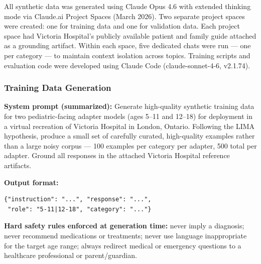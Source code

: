 \documentclass[journal]{IEEEtai}
\begin{document}
All synthetic data was generated using Claude Opus 4.6 with extended thinking mode via Claude.ai Project Spaces (March 2026). Two separate project spaces were created: one for training data and one for validation data. Each project space had Victoria Hospital's publicly available patient and family guide attached as a grounding artifact. Within each space, five dedicated chats were run --- one per category --- to maintain context isolation across topics. Training scripts and evaluation code were developed using Claude Code (claude-sonnet-4-6, v2.1.74).

\subsubsection*{Training Data Generation}

\noindent\textbf{System prompt (summarized):} Generate high-quality synthetic training data for two pediatric-facing adapter models (ages 5--11 and 12--18) for deployment in a virtual recreation of Victoria Hospital in London, Ontario. Following the LIMA hypothesis, produce a small set of carefully curated, high-quality examples rather than a large noisy corpus --- 100 examples per category per adapter, 500 total per adapter. Ground all responses in the attached Victoria Hospital reference artifacts.

\noindent\textbf{Output format:}
\begin{verbatim}
{"instruction": "...", "response": "...",
 "role": "5-11|12-18", "category": "..."}
\end{verbatim}

\noindent\textbf{Hard safety rules enforced at generation time:} never imply a diagnosis; never recommend medications or treatments; never use language inappropriate for the target age range; always redirect medical or emergency questions to a healthcare professional or parent/guardian.
\end{document}
